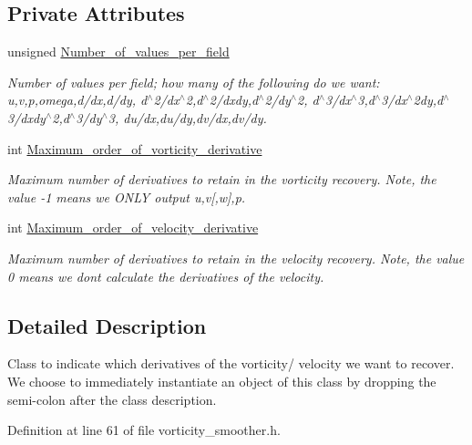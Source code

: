 \subsection*{Private Attributes}
\begin{DoxyCompactItemize}
\item 
unsigned \hyperlink{classVorticityRecoveryHelpers_1_1RecoveryHelper_a8c3f392e7798627cc08eeebdfa535ff0}{Number\+\_\+of\+\_\+values\+\_\+per\+\_\+field}
\begin{DoxyCompactList}\small\item\em Number of values per field; how many of the following do we want\+: u,v,p,omega,d/dx,d/dy, d$^\wedge$2/dx$^\wedge$2,d$^\wedge$2/dxdy,d$^\wedge$2/dy$^\wedge$2, d$^\wedge$3/dx$^\wedge$3,d$^\wedge$3/dx$^\wedge$2dy,d$^\wedge$3/dxdy$^\wedge$2,d$^\wedge$3/dy$^\wedge$3, du/dx,du/dy,dv/dx,dv/dy. \end{DoxyCompactList}\item 
int \hyperlink{classVorticityRecoveryHelpers_1_1RecoveryHelper_acbaab5c7bbd994bb001a9a1afec9b8f7}{Maximum\+\_\+order\+\_\+of\+\_\+vorticity\+\_\+derivative}
\begin{DoxyCompactList}\small\item\em Maximum number of derivatives to retain in the vorticity recovery. Note, the value -\/1 means we O\+N\+LY output u,v\mbox{[},w\mbox{]},p. \end{DoxyCompactList}\item 
int \hyperlink{classVorticityRecoveryHelpers_1_1RecoveryHelper_aa1081715e9a53e4ff309d4eacfce8a80}{Maximum\+\_\+order\+\_\+of\+\_\+velocity\+\_\+derivative}
\begin{DoxyCompactList}\small\item\em Maximum number of derivatives to retain in the velocity recovery. Note, the value 0 means we don\textquotesingle{}t calculate the derivatives of the velocity. \end{DoxyCompactList}\end{DoxyCompactItemize}


\subsection{Detailed Description}
Class to indicate which derivatives of the vorticity/ velocity we want to recover. We choose to immediately instantiate an object of this class by dropping the semi-\/colon after the class description. 

Definition at line 61 of file vorticity\+\_\+smoother.\+h.



